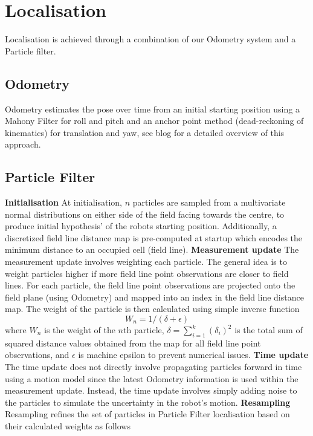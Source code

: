 \documentclass{llncs}
\begin{document}
\section{Localisation}


Localisation is achieved through a combination of our Odometry system and a Particle filter. 


\subsection{Odometry}
Odometry estimates the pose over time from an initial starting position using a Mahony Filter \cite{Mahony2008} for roll and pitch and an anchor point method (dead-reckoning of kinematics) for translation and yaw, see blog \cite{CaronFloating} for a detailed overview of this approach.

\subsection{Particle Filter}

\textbf{Initialisation}\newline
At initialisation, $n$ particles are sampled from a multivariate normal distributions on either side of the field facing towards the centre, to produce initial hypothesis' of the robots starting position. Additionally, a discretized field line distance map is pre-computed at startup which encodes the minimum distance to an occupied cell (field line).\newline
\textbf{Measurement update}\newline
The measurement update involves weighting each particle. The general idea is to weight particles higher if more field line point observations are closer to field lines. For each particle, the field line point observations are projected onto the field plane (using Odometry) and mapped into an index in the field line distance map. The weight of the particle is then calculated using simple inverse function
$$
W_n = 1/(\delta + \epsilon)
$$
where $W_n$ is the weight of the $n$th particle, $\delta = \sum_{i=1}^{k} (\delta_i)^2$ is the total sum of squared distance values obtained from the map for all field line point observations, and $\epsilon$ is machine epsilon to prevent numerical issues.\newline
\textbf{Time update}\newline
The time update does not directly involve propagating particles forward in time using a motion model since the latest Odometry information is used within the measurement update. Instead, the time update involves simply adding noise to the particles to simulate the uncertainty in the robot's motion.\newline
\textbf{Resampling}\newline
Resampling refines the set of particles in Particle Filter localisation based on their calculated weights as follows
\end{document}
